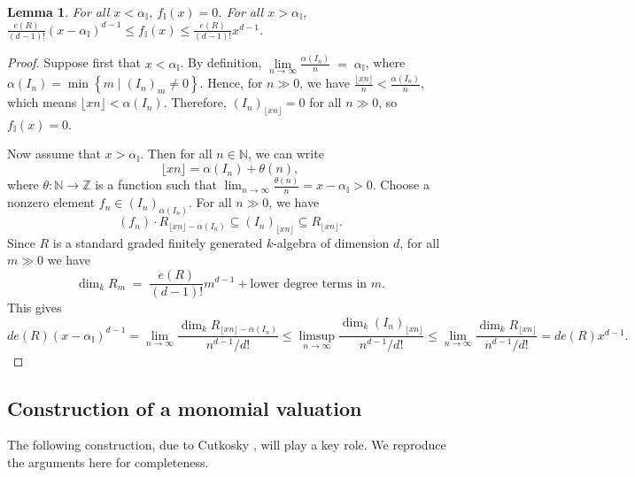 \documentclass[12pt,a4paper]{amsart}
\theoremstyle{plain}
\newtheorem{lemma}[theorem]{Lemma}
\theoremstyle{definition}
\numberwithin{equation}{theorem}
\begin{document}
\begin{lemma}\label{easy}
For all $x<\alpha_{\mathbb{I}}$, $f_{\mathbb{I}}(x)=0$. For all $x>\alpha_{\mathbb{I}}$, $\frac{e(R)}{(d-1)!}(x-\alpha_{\mathbb{I}})^{d-1} \leq f_{\mathbb{I}}(x) \leq \frac{e(R)}{(d-1)!}x^{d-1}$.
\end{lemma}
\begin{proof}
Suppose first that $x<\alpha_{\mathbb{I}}$. By definition, $\lim\limits_{n\to\infty}\frac{\alpha(I_n)}{n} \;=\;\alpha_{\mathbb{I}}$, where $\alpha(I_n) = \min\left\{m \mid {\left(I_n\right)}_m\neq 0\right\}$. Hence, for $n\gg 0$, we have $\frac{\lfloor xn \rfloor}{n} < \frac{\alpha(I_n)}{n}$, which means $\lfloor xn \rfloor < \alpha(I_n)$. Therefore, $(I_n)_{\lfloor xn \rfloor}=0$ for all $n\gg 0$, so $f_{\mathbb{I}}(x)=0$.

Now assume that $x>\alpha_{\mathbb{I}}$. Then for all $n\in\mathbb{N}$, we can write $$\lfloor xn \rfloor = \alpha(I_n) + \theta(n),$$ where $\theta \colon \mathbb{N} \to \mathbb{Z}$ is a function such that $\lim_{n\to\infty}\frac{\theta(n)}{n} = x-\alpha_{\mathbb{I}}>0$. Choose a nonzero element $f_n \in {(I_n)}_{\alpha(I_n)}$. For all $n\gg 0$, we have $$(f_n)\cdot R_{\lfloor xn \rfloor - \alpha(I_n)} \subseteq {(I_n)}_{\lfloor xn \rfloor} \subseteq {R}_{\lfloor xn \rfloor}.$$ Since $R$ is a standard graded finitely generated $k$-algebra of dimension $d$, for all $m\gg0$ we have \[
\dim_k R_m \;=\; \frac{e(R)}{(d-1)!} m^{d-1} + \text{lower degree terms in $m$}.
\] This gives $$de(R)(x-\alpha_{\mathbb{I}})^{d-1} = \lim_{n\to\infty}\dfrac{\dim_k {R}_{\lfloor xn \rfloor - \alpha(I_n)}}{n^{d-1}/d!} \leq \limsup_{n\to\infty}\dfrac{\dim_k {\left(I_n\right)}_{\lfloor xn \rfloor}}{n^{d-1}/d!} \leq \lim_{n\to\infty}\dfrac{\dim_k {R}_{\lfloor xn \rfloor}}{n^{d-1}/d!} = de(R)x^{d-1}.$$
\end{proof}

\subsection{Construction of a monomial valuation}

The following construction, due to Cutkosky \cite{Cut15}, will play a key role. We reproduce the arguments here for completeness.
\end{document}
